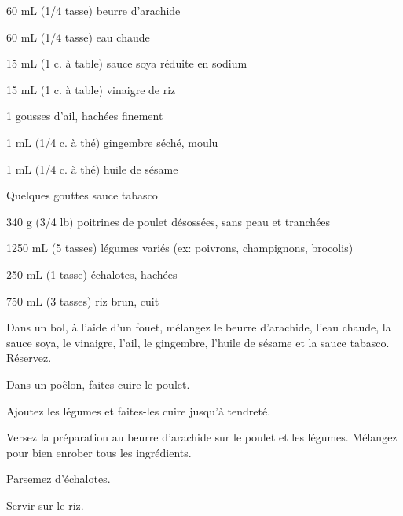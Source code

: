 


\totaltime{}


\begin{ingredients}
    \item 60 mL (1/4 tasse) beurre d’arachide
    \item 60 mL (1/4 tasse) eau chaude
    \item 15 mL (1 c. à table) sauce soya réduite en sodium
    \item 15 mL (1 c. à table) vinaigre de riz
    \item 1 gousses d'ail, hachées finement
    \item 1 mL (1/4 c. à thé) gingembre séché, moulu
    \item 1 mL (1/4 c. à thé) huile de sésame
    \item Quelques gouttes sauce tabasco
    \item 340 g (3/4 lb) poitrines de poulet désossées, sans peau et tranchées
    \item 1250 mL (5 tasses) légumes variés (ex: poivrons, champignons, brocolis)
    \item 250 mL (1 tasse) échalotes, hachées
    \item 750 mL (3 tasses) riz brun, cuit
\end{ingredients}

\begin{steps}
    \item Dans un bol, à l’aide d’un fouet, mélangez le beurre d’arachide, l’eau chaude, la sauce soya, le vinaigre, l’ail, le gingembre, l’huile de sésame et la sauce tabasco. Réservez.
    \item Dans un poêlon, faites cuire le poulet.
    \item Ajoutez les légumes et faites-les cuire jusqu'à tendreté.
    \item Versez la préparation au beurre d’arachide sur le poulet et les légumes. Mélangez pour bien enrober tous les ingrédients.
    \item Parsemez d’échalotes.
    \item Servir sur le riz.
\end{steps}
